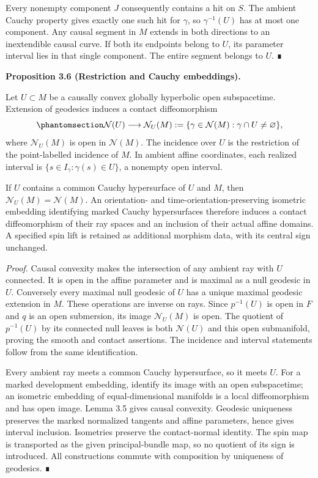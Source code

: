 \documentclass[
  english,
  11pt,
  reqno]{amsart}
\makeatletter
\newcounter{none} %
\newcommand{\pandocstatementheading}[1]{%
  \par\addpenalty{\@beginparpenalty}%
  \addvspace{.5\baselineskip plus .2\baselineskip minus .2\baselineskip}%
  {\normalfont\bfseries #1\par}%
  \nobreak\@afterindenttrue\@afterheading
}
\makeatother
\begin{document}
Every nonempty component \(J\) consequently contains a hit on \(S\). The
ambient Cauchy property gives exactly one such hit for \(\gamma\), so
\(\gamma^{-1}(U)\) has at most one component. Any causal segment in
\(M\) extends in both directions to an inextendible causal curve. If
both its endpoints belong to \(U\), its parameter interval lies in that
single component. The entire segment belongs to \(U\). ∎

\pandocstatementheading{\protect{}\label{prop:global-ray-restriction}Proposition 3.6 (Restriction and Cauchy embeddings).}

Let \(U\subset M\) be a causally convex globally hyperbolic open
subspacetime. Extension of geodesics induces a contact diffeomorphism
\begin{equation}\protect\phantomsection\label{eq:global-ray-restriction}{
\mathcal N(U)\longrightarrow
\mathcal N_U(M):=\{\gamma\in\mathcal N(M):\gamma\cap U\ne\varnothing\},
}\end{equation} where \(\mathcal N_U(M)\) is open in \(\mathcal N(M)\).
The incidence over \(U\) is the restriction of the point-labelled
incidence of \(M\). In ambient affine coordinates, each realized
interval is \(\{s\in I_\gamma:\gamma(s)\in U\}\), a nonempty open
interval.

If \(U\) contains a common Cauchy hypersurface of \(U\) and \(M\), then
\(\mathcal N_U(M)=\mathcal N(M)\). An orientation- and
time-orientation-preserving isometric embedding identifying marked
Cauchy hypersurfaces therefore induces a contact diffeomorphism of their
ray spaces and an inclusion of their actual affine domains. A specified
spin lift is retained as additional morphism data, with its central sign
unchanged.

\emph{Proof.} Causal convexity makes the intersection of any ambient ray
with \(U\) connected. It is open in the affine parameter and is maximal
as a null geodesic in \(U\). Conversely every maximal null geodesic of
\(U\) has a unique maximal geodesic extension in \(M\). These operations
are inverse on rays. Since \(p^{-1}(U)\) is open in \(F\) and \(q\) is
an open submersion, its image \(\mathcal N_U(M)\) is open. The quotient
of \(p^{-1}(U)\) by its connected null leaves is both \(\mathcal N(U)\)
and this open submanifold, proving the smooth and contact assertions.
The incidence and interval statements follow from the same
identification.

Every ambient ray meets a common Cauchy hypersurface, so it meets \(U\).
For a marked development embedding, identify its image with an open
subspacetime; an isometric embedding of equal-dimensional manifolds is a
local diffeomorphism and has open image. Lemma 3.5 gives causal
convexity. Geodesic uniqueness preserves the marked normalized tangents
and affine parameters, hence gives interval inclusion. Isometries
preserve the contact-normal identity. The spin map is transported as the
given principal-bundle map, so no quotient of its sign is introduced.
All constructions commute with composition by uniqueness of geodesics. ∎
\end{document}
